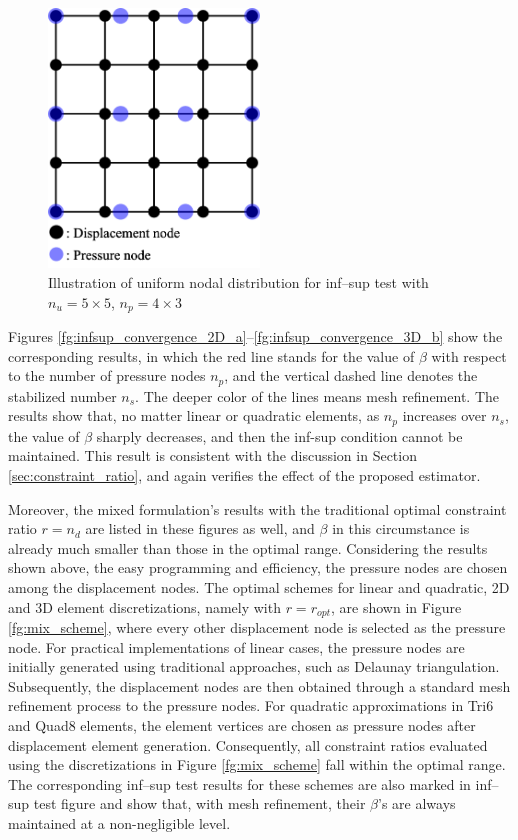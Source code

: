 \begin{figure}[H]
\centering
\includegraphics[width=0.5\textwidth]{infsup_mesh.png}
\caption{Illustration of uniform nodal distribution for inf--sup test with $n_u=5\times5$, $n_p=4\times3$}\label{fg:infsup_mesh}
\end{figure}

Figures \ref{fg:infsup_convergence_2D_a}--\ref{fg:infsup_convergence_3D_b} show the corresponding results, in which the red line stands for the value of $\beta$ with respect to the number of pressure nodes $n_p$, and the vertical dashed line denotes the stabilized number $n_s$. The deeper color of the lines means mesh refinement. The results show that, no matter linear or quadratic elements, as $n_p$ increases over $n_s$, the value of $\beta$ sharply decreases, and then the inf-sup condition cannot be maintained. This result is consistent with the discussion in Section \ref{sec:constraint_ratio}, and again verifies the effect of the proposed estimator.

Moreover, the mixed formulation's results with the traditional optimal constraint ratio $r=n_d$ are listed in these figures as well, and $\beta$ in this circumstance is already much smaller than those in the optimal range. Considering the results shown above, the easy programming and efficiency, the pressure nodes are chosen among the displacement nodes.
The optimal schemes for linear and quadratic, 2D and 3D element discretizations, namely with $r=r_{opt}$, are shown in Figure \ref{fg:mix_scheme},
where every other displacement node is selected as the pressure node.
For practical implementations of linear cases, the pressure nodes are initially generated using traditional approaches, such as Delaunay triangulation.
Subsequently, the displacement nodes are then obtained through a standard mesh refinement process to the pressure nodes.
For quadratic approximations in Tri6 and Quad8 elements, the element vertices are chosen as pressure nodes after displacement element generation.
Consequently, all constraint ratios evaluated using the discretizations in Figure \ref{fg:mix_scheme} fall within the optimal range.
The corresponding inf--sup test results for these schemes are also marked in inf--sup test figure and show that, with mesh refinement, their $\beta$'s are always maintained at a non-negligible level.

